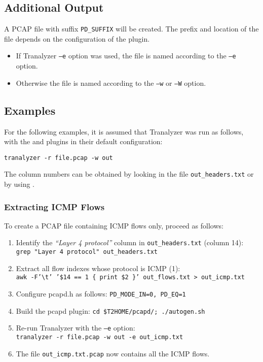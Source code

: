 \documentclass[documentation]{subfiles}
\begin{document}
\subsection{Additional Output}
A PCAP file with suffix {\tt PD\_SUFFIX} will be created.
The prefix and location of the file depends on the configuration of the plugin.
\begin{itemize}
    \item If Tranalyzer {\tt --e} option was used, the file is named according to the {\tt --e} option.
    \item Otherwise the file is named according to the {\tt --w} or {\tt --W} option.
\end{itemize}

\subsection{Examples}
For the following examples, it is assumed that Tranalyzer was run as follows, with the  and  plugins in their default configuration:
\begin{center}
    {\tt tranalyzer -r file.pcap -w out}
\end{center}

The column numbers can be obtained by looking in the file {\tt out\_headers.txt} or by using .

\subsubsection{Extracting ICMP Flows}\label{pdicmp}
To create a PCAP file containing ICMP flows only, proceed as follows:
\begin{enumerate}
    \item Identify the {\em ``Layer 4 protocol''} column in {\tt out\_headers.txt} (column 14):\\
        {\tt grep "Layer 4 protocol" out\_headers.txt}
    \item Extract all flow indexes whose protocol is ICMP (1):\\
        {\tt awk -F'\textbackslash{}t' '\$14 == 1 \{ print \$2 \}' out\_flows.txt > out\_icmp.txt}
    \item Configure pcapd.h as follows: {\tt PD\_MODE\_IN=0, PD\_EQ=1}
    \item Build the pcapd plugin: {\tt cd \$T2HOME/pcapd/; ./autogen.sh}
    \item Re-run Tranalyzer with the {\tt --e} option:\\
        {\tt tranalyzer -r file.pcap -w out -e out\_icmp.txt}
    \item The file {\tt out\_icmp.txt.pcap} now contains all the ICMP flows.\\
\end{enumerate}
\end{document}
